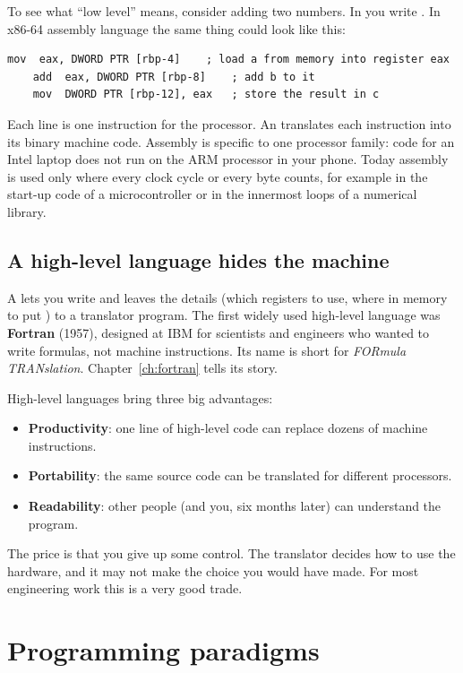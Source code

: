 To see what ``low level'' means, consider adding two numbers. In \py you write
. In x86-64 assembly language the same thing could look like this:
\begin{lstlisting}[language={[x86masm]Assembler}]
    mov  eax, DWORD PTR [rbp-4]    ; load a from memory into register eax
    add  eax, DWORD PTR [rbp-8]    ; add b to it
    mov  DWORD PTR [rbp-12], eax   ; store the result in c
\end{lstlisting}
Each line is one instruction for the processor. An  translates each
instruction into its binary machine code. Assembly is specific to one processor family:
code for an Intel laptop does not run on the ARM processor in your phone. Today
assembly is used only where every clock cycle or every byte counts, for example in the
start-up code of a microcontroller or in the innermost loops of a numerical library.

\subsection*{A high-level language hides the machine}

A  lets you write  and leaves the details
(which registers to use, where in memory to put ) to a translator program. The
first widely used high-level language was \textbf{Fortran} (1957), designed at IBM for
scientists and engineers who wanted to write formulas, not machine instructions. Its name
is short for \emph{FORmula TRANslation}. Chapter~\ref{ch:fortran} tells its story.

High-level languages bring three big advantages:
\begin{itemize}
\item \textbf{Productivity}: one line of high-level code can replace dozens of machine
  instructions.
\item \textbf{Portability}: the same source code can be translated for different
  processors.
\item \textbf{Readability}: other people (and you, six months later) can understand the
  program.
\end{itemize}
The price is that you give up some control. The translator decides how to use the
hardware, and it may not make the choice you would have made. For most engineering work
this is a very good trade.

\section{Programming paradigms}

